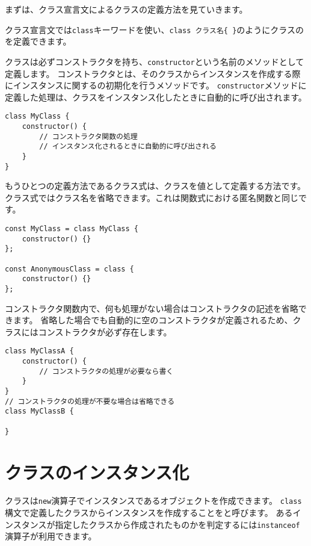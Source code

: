まずは、クラス宣言文によるクラスの定義方法を見ていきます。

クラス宣言文では\texttt{class}キーワードを使い、\texttt{class クラス名\{ \}}のようにクラスの\textbf{}を定義できます。

クラスは必ずコンストラクタを持ち、\texttt{constructor}という名前のメソッドとして定義します。
コンストラクタとは、そのクラスからインスタンスを作成する際にインスタンスに関する\textbf{}の初期化を行うメソッドです。
\texttt{constructor}メソッドに定義した処理は、クラスをインスタンス化したときに自動的に呼び出されます。

\begin{lstlisting}
class MyClass {
    constructor() {
        // コンストラクタ関数の処理
        // インスタンス化されるときに自動的に呼び出される
    }
}
\end{lstlisting}

もうひとつの定義方法であるクラス式は、クラスを値として定義する方法です。
クラス式ではクラス名を省略できます。これは関数式における匿名関数と同じです。

\begin{lstlisting}
const MyClass = class MyClass {
    constructor() {}
};

const AnonymousClass = class {
    constructor() {}
};
\end{lstlisting}

コンストラクタ関数内で、何も処理がない場合はコンストラクタの記述を省略できます。
省略した場合でも自動的に空のコンストラクタが定義されるため、クラスにはコンストラクタが必ず存在します。

\begin{lstlisting}
class MyClassA {
    constructor() {
        // コンストラクタの処理が必要なら書く
    }
}
// コンストラクタの処理が不要な場合は省略できる
class MyClassB {

}
\end{lstlisting}

\hypertarget{class-instance}{%
\section{クラスのインスタンス化}\label{class-instance}}

クラスは\texttt{new}演算子でインスタンスであるオブジェクトを作成できます。
\texttt{class}構文で定義したクラスからインスタンスを作成することを\textbf{}と呼びます。
あるインスタンスが指定したクラスから作成されたものかを判定するには\texttt{instanceof}演算子が利用できます。

